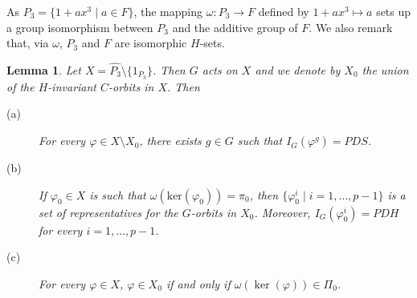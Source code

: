 \documentclass{amsart}
\newtheorem{lemma}[theorem]{Lemma}
\begin{document}
\smallskip
As $P_3=\{1+a x^3\mid a\in F\}$,
the mapping $\omega: P_3\to F$ defined by $1+a x^3\mapsto a$ sets up a group isomorphism
between  $P_3$ and the additive group of $F$. We also remark that, via $\omega$,  $P_3$ and $F$ are isomorphic $H$-sets.
\begin{lemma} \label{lce}
  Let $X = \widehat{P_3}\setminus\{1_{P_3}\}$. Then $G$ acts on $X$  and we denote by $X_0$  the union of the $H$-invariant $C$-orbits in $X$. Then
  \begin{description}
  \item[(a)] For every $\varphi \in X \setminus X_0$, there exists  $g \in G$ such that $I_G(\varphi^g) = PDS$.
  \item[(b)] If $\varphi_0 \in X$ is such that $\omega(\mathrm{ker}(\varphi_0)) = \pi_0$, then $\{ \varphi_0^i \mid i = 1, \ldots, p-1\}$
    is a set of representatives  for the $G$-orbits in $X_0$. Moreover, $I_G(\varphi_0^i) = PDH$ for every $i = 1, \ldots, p-1$.
  \item[(c)] For every $\varphi \in X$, $\varphi\in X_0$ if and only if  $\omega(\ker(\varphi)) \in \Pi_0$.
  \end{description}
\end{lemma}
\end{document}

